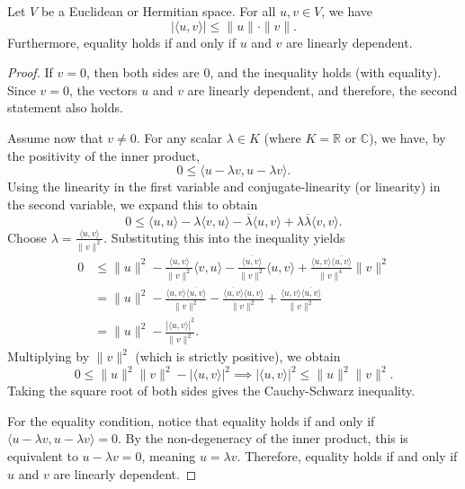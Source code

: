 \begin{theorem}
    \label{thm:cauchy_schwarz}
    Let $V$ be a Euclidean or Hermitian space. For all $u, v \in V$, we have
    \begin{equation*}
        |\langle u, v \rangle| \leq \|u\| \cdot \|v\|.
    \end{equation*}
    Furthermore, equality holds if and only if $u$ and $v$ are linearly dependent.
\end{theorem}

\begin{proof}
    If $v = 0$, then both sides are $0$, and the inequality holds (with equality). Since $v = 0$, the vectors $u$ and $v$ are linearly dependent, and therefore, the second statement also holds.
    
    Assume now that $v \neq 0$. For any scalar $\lambda \in K$ (where $K = \mathbb{R}$ or $\mathbb{C}$), we have, by the positivity of the inner product,
    \begin{equation*}
        0 \leq \langle u - \lambda v, u - \lambda v \rangle.
    \end{equation*}
    Using the linearity in the first variable and conjugate-linearity (or linearity) in the second variable, we expand this to obtain
    \begin{equation*}
        0 \leq \langle u, u \rangle - \lambda \langle v, u \rangle - \overline{\lambda} \langle u, v \rangle + \lambda \overline{\lambda} \langle v, v \rangle.
    \end{equation*}
    Choose $\lambda = \frac{\langle u, v \rangle}{\|v\|^2}$. Substituting this into the inequality yields
    \begin{align*}
        0 &\leq \|u\|^2 - \frac{\langle u, v \rangle}{\|v\|^2} \langle v, u \rangle - \frac{\overline{\langle u, v \rangle}}{\|v\|^2} \langle u, v \rangle + \frac{\langle u, v \rangle \overline{\langle u, v \rangle}}{\|v\|^4} \|v\|^2 \\
        &= \|u\|^2 - \frac{\langle u, v \rangle \overline{\langle u, v \rangle}}{\|v\|^2} - \frac{\overline{\langle u, v \rangle} \langle u, v \rangle}{\|v\|^2} + \frac{\langle u, v \rangle \overline{\langle u, v \rangle}}{\|v\|^2} \\
        &= \|u\|^2 - \frac{|\langle u, v \rangle|^2}{\|v\|^2}.
    \end{align*}
    Multiplying by $\|v\|^2$ (which is strictly positive), we obtain
    \begin{equation*}
        0 \leq \|u\|^2 \|v\|^2 - |\langle u, v \rangle|^2 \implies |\langle u, v \rangle|^2 \leq \|u\|^2 \|v\|^2.
    \end{equation*}
    Taking the square root of both sides gives the Cauchy-Schwarz inequality.
    
    For the equality condition, notice that equality holds if and only if $\langle u - \lambda v, u - \lambda v \rangle = 0$. By the non-degeneracy of the inner product, this is equivalent to $u - \lambda v = 0$, meaning $u = \lambda v$. Therefore, equality holds if and only if $u$ and $v$ are linearly dependent.
\end{proof}

